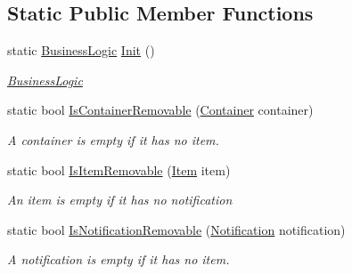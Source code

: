 \subsection*{Static Public Member Functions}
\begin{DoxyCompactItemize}
\item 
static \mbox{\hyperlink{class_gtd_app_1_1_logic_1_1_business_logic}{Business\+Logic}} \mbox{\hyperlink{class_gtd_app_1_1_logic_1_1_business_logic_abadac4866339d761399e001b333ea829}{Init}} ()
\begin{DoxyCompactList}\small\item\em \mbox{\hyperlink{class_gtd_app_1_1_logic_1_1_business_logic}{Business\+Logic}} \end{DoxyCompactList}\item 
static bool \mbox{\hyperlink{class_gtd_app_1_1_logic_1_1_business_logic_a62422f0f7fedb58ed9681bc65e5927ed}{Is\+Container\+Removable}} (\mbox{\hyperlink{class_gtd_app_1_1_data_1_1_container}{Container}} container)
\begin{DoxyCompactList}\small\item\em A container is empty if it has no item. \end{DoxyCompactList}\item 
static bool \mbox{\hyperlink{class_gtd_app_1_1_logic_1_1_business_logic_a701d1378c420398991de26e17d60b810}{Is\+Item\+Removable}} (\mbox{\hyperlink{class_gtd_app_1_1_data_1_1_item}{Item}} item)
\begin{DoxyCompactList}\small\item\em An item is empty if it has no notification \end{DoxyCompactList}\item 
static bool \mbox{\hyperlink{class_gtd_app_1_1_logic_1_1_business_logic_a850d5c9c7bdc3377bc6333f5ea350560}{Is\+Notification\+Removable}} (\mbox{\hyperlink{class_gtd_app_1_1_data_1_1_notification}{Notification}} notification)
\begin{DoxyCompactList}\small\item\em A notification is empty if it has no item. \end{DoxyCompactList}\end{DoxyCompactItemize}
